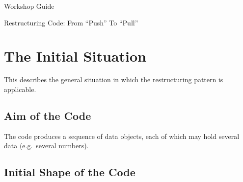 \documentclass[a4paper,fleqn,titlepage,11pt]{article}
\begin{document}
\thispagestyle{empty}

\begin{center}
\LARGE
Workshop Guide

\vspace{1cm}

Restructuring Code: From ``Push''  To ``Pull''
\end{center}

\normalsize

\vspace{0.6cm}



\section{The Initial Situation}

This describes the general situation in which the restructuring pattern is applicable.

\subsection{Aim of the Code}

The code produces a sequence of data objects, each of which may hold several data (e.g.~several numbers).

\subsection{Initial Shape of the Code}
\end{document}
